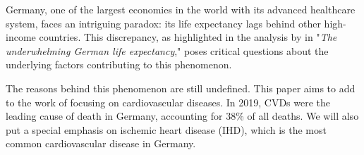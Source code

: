 
Germany, one of the largest economies in the world with its advanced healthcare 
system, faces an intriguing paradox: its life expectancy lags behind other 
high-income countries. This discrepancy, as highlighted in the analysis by 
\citet{Jasilionis2023} in "\textit{The underwhelming German life expectancy}," 
poses critical questions about the underlying factors contributing to this 
phenomenon.

The reasons behind this phenomenon are still undefined. This paper aims to add to 
the work of \citet{Jasilionis2023} focusing on cardiovascular diseases. In 2019,
CVDs were the leading cause of death in Germany, accounting for 38\% of all deaths. 
We will also put a special emphasis on ischemic heart disease (IHD), which is the
most common cardiovascular disease in Germany.

